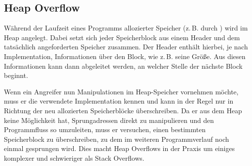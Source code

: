 \subsection{Heap Overflow}
Während der Laufzeit eines Programms allozierter Speicher (z.\,B. durch ) wird im Heap angelegt. Dabei setzt sich
jeder Speicherblock aus einem Header und dem tatsächlich angeforderten Speicher zusammen. Der Header enthält hierbei,
je nach Implementation, Informationen über den Block, wie z.\,B. seine Größe. Aus diesen Informationen kann dann abgeleitet
werden, an welcher Stelle der nächste Block beginnt.

Wenn ein Angreifer nun Manipulationen im Heap-Speicher vornehmen möchte, muss er die verwendete Implementation kennen
und kann in der Regel nur in Richtung der neu allozierten Speicherblöcke überschreiben. Da er aus dem Heap keine Möglichkeit
hat, Sprungadressen direkt zu manipulieren und den Programmfluss so umzuleiten, muss er versuchen, einen bestimmten
Speicherblock zu überschreiben, zu dem im weiteren Programmverlauf noch einmal gesprungen wird. Dies macht Heap Overflows
in der Praxis um einiges komplexer und schwieriger als Stack Overflows.

